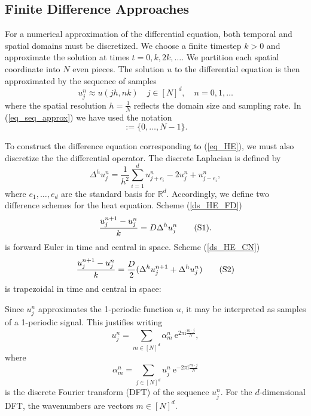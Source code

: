 \documentclass[12pt, reqno]{report}
\theoremstyle{definition}
\theoremstyle{remark}
\newcommand{\e}{\mathrm{e}}
\renewcommand{\i}{\mathrm{i}}
\begin{document}
\subsection{Finite Difference Approaches} \label{sssec_heat_fd}


For a numerical approximation of the differential equation, both temporal and spatial domains must be discretized. 
We choose a finite timestep $k>0$ and approximate the solution at times $t=0,k,2k,\ldots$. 
We partition each spatial coordinate into $N$ even pieces. The solution $u$ to the differential equation is then approximated by the sequence of samples
\begin{equation} \label{eq_seq_approx}
	u_j^n\approx u(jh,nk)\quad j\in[N]^d,\quad n=0,1,\ldots
\end{equation}
where the spatial resolution $h=\frac{1}{N}$ reflects the domain size and sampling rate. 
In (\ref{eq_seq_approx}) we have used the notation
\begin{equation}
    [N]:=\{0,\ldots,N-1\}.
\end{equation}

To construct the difference equation corresponding to (\ref{eq_HE}), we must also discretize the the differential operator. 
The discrete Laplacian is defined by
\begin{equation}
    \Delta^hu_j^n=\frac{1}{h^2}\sum_{i=1}^d u_{j+e_i}^n-2u_j^n+u_{j-e_i}^n,
\end{equation}
where $e_1,\ldots,e_d$ are the standard basis for $\mathbb{R}^d$.
Accordingly, we define two difference schemes for the heat equation. 
Scheme (\ref{ds_HE_FD}) 
\begin{equation} \label{ds_HE_FD}
	\frac{u_j^{n+1}-u_j^n}{k}=D\Delta^hu_j^n{\tag{S1}}.
\end{equation}
is forward Euler in time and central in space.
Scheme (\ref{ds_HE_CN})
\begin{equation} \label{ds_HE_CN}
	\frac{u_j^{n+1}-u_j^n}{k}=\frac{D}{2}(\Delta^hu_j^{n+1}+\Delta^hu_j^n){\tag{S2}}
\end{equation}
is trapezoidal in time and central in space:

Since $u_{j}^{n}$ approximates the 1-periodic function $u$, it may be interpreted as samples of a 1-periodic signal. 
This justifies writing 
\begin{equation} \label{eq_as_DFT}
    u_{j}^{n}=\sum_{m\in[N]^{d}}\alpha_{m}^{n}~\e^{2\pi\i \frac{m\cdot j}{N}},
\end{equation}
where 
\begin{equation} 
    \alpha_{m}^{n}=\sum_{j\in[N]^{d}}u_{j}^{n}~\e^{-2\pi\i \frac{m\cdot j}{N}}
\end{equation}
is the discrete Fourier transform (DFT) of the sequence $u_{j}^{n}$. 
For the $d$-dimensional DFT, the wavenumbers are vectors $m\in [N]^{d}$.
\end{document}
